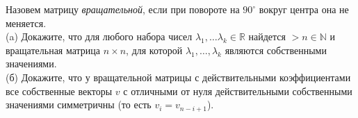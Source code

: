 \documentclass{article}
\begin{document}
Назовем матрицу \textit{вращательной}, если при повороте на $90^{\circ}$ вокруг центра она не меняется.\\
   (a) Докажите, что для любого набора чисел $\lambda_1, \ldots \lambda_k \in \mathbb{R}$ найдется $>n \in \mathbb{N}$
и вращательная матрица $n\times n$, для которой $\lambda_1, \ldots, \lambda_k$ являются собственными значениями.\\
   (б) Докажите, что у вращательной матрицы с действительными коэффициентами все собственные векторы $v$ с отличными от нуля действительными собственными значениями
симметричны (то есть $v_i = v_{n-i+1}$).
\end{document}
